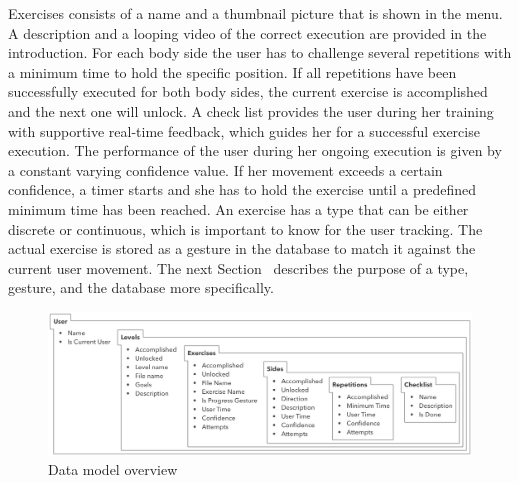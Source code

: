 Exercises consists of a name and a thumbnail picture that is shown in the menu. A description and a looping video of the correct execution are provided in the introduction.
For each body side the user has to challenge several repetitions with a minimum time to hold the specific position.
If all repetitions have been successfully executed for both body sides, the current exercise is accomplished and the next one will unlock.
A check list provides the user during her training with supportive real-time feedback, which guides her for a successful exercise execution.
The performance of the user during her ongoing execution is given by a constant varying confidence value.
If her movement exceeds a certain confidence, a timer starts and she has to hold the exercise until a predefined minimum time has been reached.
An exercise has a type that can be either discrete or continuous, which is important to know for the user tracking. 
The actual exercise is stored as a gesture in the database to match it against the current user movement.
The next Section~\textit{} describes the purpose of a type, gesture, and the database more specifically.

\begin{figure}[htb]
	\centering
	\begin{minipage}[t]{1\linewidth}
		\centering
		\includegraphics[width=1\linewidth]{Pictures/5_2_dataModel}
		\caption{Data model overview}
		\label{fig:5_2_dataModel}
	\end{minipage}
\end{figure}

